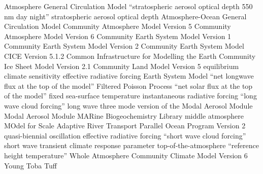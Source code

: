 \documentclass[draft]{agujournal2019}
\begin{document}
\begin{acronyms}
   Atmosphere General Circulation Model  ``stratospheric
  aerosol optical depth 550 nm day night''  stratospheric aerosol optical depth
   Atmosphere-Ocean General Circulation Model  Community Atmosphere
  Model Version 5  Community Atmosphere Model Version 6  Community
  Earth System Model Version 1  Community Earth System Model Version 2
   Community Earth System Model  CICE Version 5.1.2 
  Common Infrastructure for Modelling the Earth  Community Ice Sheet Model
  Version 2.1  Community Land Model Version 5  equilibrium climate
  sensitivity  effective radiative forcing  Earth System Model
   ``net longwave flux at the top of the model''  Filtered Poisson
  Process  ``net solar flux at the top of the model''  fixed
  sea-surface temperature  instantaneous radiative forcing  ``long
  wave cloud forcing''  long wave  three mode version of the Modal
  Aerosol Module  Modal Aerosol Module  MARine Biogeochemistry
  Library  middle atmosphere  MOdel for Scale Adaptive River
  Transport  Parallel Ocean Program Version 2  quasi-biennial
  oscillation  effective radiative forcing  ``short wave cloud
  forcing''  short wave  transient climate response parameter
   top-of-the-atmosphere  ``reference height temperature''
   Whole Atmosphere Community Climate Model Version 6  Young Toba Tuff
\end{acronyms}

\end{document}
